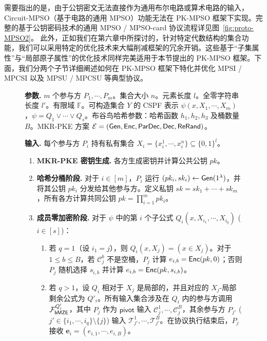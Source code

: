 需要指出的是，由于公钥密文无法直接作为通用布尔电路或算术电路的输入，Circuit-MPSO（基于电路的通用 MPSO）功能无法在 PK-MPSO 框架下实现。完整的基于公钥密码技术的通用 MPSO / MPSO-card 协议流程详见图~\ref{fig:proto-MPSO2}。
此外，正如我们在第六章中所探讨的，针对特定代数结构的集合功能，我们可以采用特定的优化技术来大幅削减框架的冗余开销。这些基于“子集属性”与“局部原子属性”的优化技术同样完美适用于本节提出的 PK-MPSO 框架。下面，我们分两个子节详细阐述如何在 PK-MPSO 框架下特化并优化 MPSI / MPCSI 以及 MPSU / MPCSU 等典型协议。

\begin{figure}[!htbp]
\begin{framed}
\begin{minipage}[c]{\textwidth}
\begin{trivlist}
\item \textbf{参数.} $m$ 个参与方 $P_1, \cdots, P_m$。集合大小 $n$。元素长度 $l$。全零字符串长度 $l'$。有限域 $\mathbb{F}$。可构造集合 $Y$ 的 CSPF 表示 $\psi(x,X_1,\cdots,X_m)$，$\psi = Q_1 \lor \cdots \lor Q_s$。布谷鸟哈希参数：哈希函数 $h_1, h_2, h_3$ 及桶数量 $B$。MKR-PKE 方案 $\mathcal{E} = (\mathsf{Gen}, \mathsf{Enc}, \mathsf{ParDec}, \mathsf{Dec}, \mathsf{ReRand})$。
\item \textbf{输入.} 每个参与方 $P_i$ 持有私有集合 $X_i = \{x_i^1,\cdots, x_i^n\} \subseteq \{0,1\}^l$。
\begin{enumerate}[itemsep=2pt,topsep=0pt,parsep=0pt]
\item \textbf{MKR-PKE 密钥生成.} 各方生成密钥并计算公共公钥 $pk$。
\item \textbf{哈希分桶阶段.} 对于 $i \in [m]$，$P_i$ 运行 $(pk_i, sk_i) \gets \mathsf{Gen}(1^\lambda)$，并将其公钥 $pk_i$ 分发给其他参与方。定义私钥 $sk = sk_1 + \cdots + sk_m$，所有各方计算共同公钥 $pk= \prod_{i =1}^m pk_i$。
\item \textbf{成员零加密阶段.} \label{step2} 对于 $\psi$ 中的第 $i$ 个子公式 $Q_i(x,X_{i_1},\cdots,X_{i_q})$ ($i \in [s]$)：
\begin{enumerate}[itemsep=2pt,topsep=0pt,parsep=0pt,leftmargin=10pt,label=(\alph*)]
    \item 若 $q = 1$（设 $i_1 = j$），则 $Q_i(x,X_j) = (x \in X_j)$。对于 $1 \le b \le B$，若 $\mathcal{C}_j^b$ 不是空桶，$P_j$ 计算 $e_{i,b} = \mathsf{Enc}(pk,0)$；否则 $P_j$ 随机选择 $s_{i,b}$ 并计算 $e_{i,b} = \mathsf{Enc}(pk,s_{i,b})$。
    \item 若 $q > 1$，设 $Q_i$ 相对于 $X_j$ 是局部的，并且对应的 $X_j$-局部剩余公式为 $Q'_i$。所有输入集合涉及在 $Q_i$ 内的参与方调用 $\mathcal{F}_\mathsf{bMZE}^{Q'_i}$，其中 $P_j$ 作为 $\mathsf{pivot}$ 输入 $\mathcal{C}_j^1, \cdots, \mathcal{C}_j^B$，其余参与方 $P_{j'}$ ($j' \in \{{i_1},\cdots,{i_q}\} \setminus \{j\}$) 输入 $\mathcal{T}_{j'}^1, \cdots, \mathcal{T}_{j'}^B$。在协议执行结束后，$P_j$ 接收 $\textbf{e}_{i}=(e_{i,1},\cdots,e_{i,B})$。
\end{enumerate}
\end{enumerate}


\end{trivlist}
\end{minipage}
\end{framed}
\end{figure}
